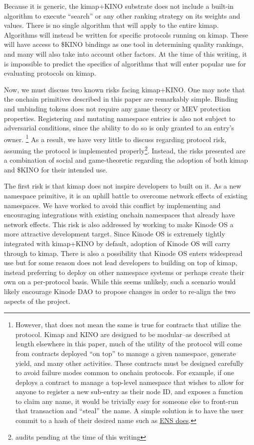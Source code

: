 \documentclass[runningheads]{llncs}
\begin{document}
Because it is generic, the kimap+KINO substrate does not include a built-in algorithm to execute ``search'' or any other ranking strategy on its weights and values.
There is no single algorithm that will apply to the entire kimap.
Algorithms will instead be written for specific protocols running on kimap.
These will have access to \$KINO bindings as one tool in determining quality rankings, and many will also take into account other factors.
At the time of this writing, it is impossible to predict the specifics of algorithms that will enter popular use for evaluating protocols on kimap.

Now, we must discuss two known risks facing kimap+KINO.
One may note that the onchain primitives described in this paper are remarkably simple.
Binding and unbinding tokens does not require any game theory or MEV protection properties.
Registering and mutating namespace entries is also not subject to adversarial conditions, since the ability to do so is only granted to an entry's owner.
\footnote{However, that does not mean the same is true for contracts that utilize the protocol.
Kimap and KINO are designed to be modular–as described at length elsewhere in this paper, much of the utility of the protocol will come from contracts deployed ``on top'' to manage a given namespace, generate yield, and many other activities.
These contracts must be designed carefully to avoid failure modes common to onchain protocols.
For example, if one deploys a contract to manage a top-level namespace that wishes to allow for anyone to register a new sub-entry as their node ID, and exposes a function to claim any name, it would be trivially easy for someone else to front-run that transaction and ``steal'' the name.
A simple solution is to have the user commit to a hash of their desired name such as \href{https://docs.ens.domains/registry/eth\#commit-reveal}{ENS does}.}
As a result, we have very little to discuss regarding protocol risk, assuming the protocol is implemented properly\footnote{audits pending at the time of this writing}.
Instead, the risks presented are a combination of social and game-theoretic regarding the adoption of both kimap and \$KINO for their intended use.

The first risk is that kimap does not inspire developers to built on it.
As a new namespace primitive, it is an uphill battle to overcome network effects of existing namespaces.
We have worked to avoid this conflict by implementing and encouraging integrations with existing onchain namespaces that already have network effects.
This risk is also addressed by working to make Kinode OS a more attractive development target.
Since Kinode OS is extremely tightly integrated with kimap+KINO by default, adoption of Kinode OS will carry through to kimap.
There is also a possibility that Kinode OS enters widespread use but for some reason does not lead developers to building on top of kimap, instead preferring to deploy on other namespace systems or perhaps create their own on a per-protocol basis.
While this seems unlikely, such a scenario would likely encourage Kinode DAO to propose changes in order to re-align the two aspects of the project.
\end{document}
